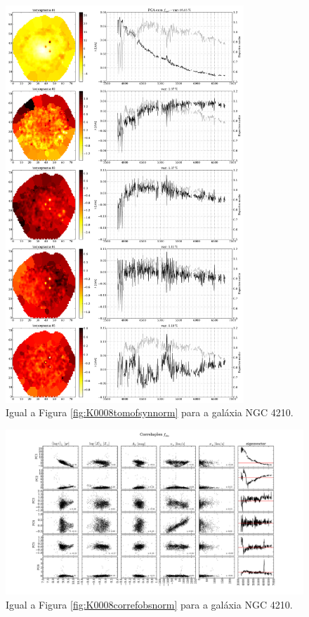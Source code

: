 \begin{figure}
    \includegraphics[width=0.8\textwidth]{figuras/K0518-tomo-syn-norm.pdf}
    \caption[Tomogramas de 1 a 5 para o cubo $f_{syn}$ - NGC 4210.]
    {Igual a Figura \ref{fig:K0008tomofsynnorm} para a galáxia NGC 4210.}
    \label{fig:K0518tomofsynnorm}
\end{figure}

\begin{figure}
    \includegraphics[width=1.2\textwidth, angle=-90]{figuras/K0518-correl-f_obs_norm-PCvsPhys.pdf}
	\caption[Correlações PCs vs. par\^ametros f\'isicos - $f_{obs}$ - NGC 4210.]
	{Igual a Figura \ref{fig:K0008correfobsnorm} para a galáxia NGC 4210.}
    \label{fig:K0518correfobsnorm}
\end{figure}

